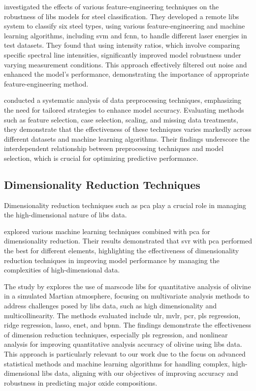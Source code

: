 \citet{jeonEffectsFeatureEngineering2024} investigated the effects of various feature-engineering techniques on the robustness of \gls{libs} models for steel classification.
They developed a remote \gls{libs} system to classify six steel types, using various feature-engineering and machine learning algorithms, including \gls{svm} and \gls{fcnn}, to handle different laser energies in test datasets.
They found that using intensity ratios, which involve comparing specific spectral line intensities, significantly improved model robustness under varying measurement conditions.
This approach effectively filtered out noise and enhanced the model's performance, demonstrating the importance of appropriate feature-engineering method.

\citet{Huang2015AnEA} conducted a systematic analysis of data preprocessing techniques, emphasizing the need for tailored strategies to enhance model accuracy.
Evaluating methods such as feature selection, case selection, scaling, and missing data treatments, they demonstrate that the effectiveness of these techniques varies markedly across different datasets and machine learning algorithms.
Their findings underscore the interdependent relationship between preprocessing techniques and model selection, which is crucial for optimizing predictive performance.

\subsection{Dimensionality Reduction Techniques}
Dimensionality reduction techniques such as \gls{pca} play a crucial role in managing the high-dimensional nature of \gls{libs} data.

\citet{rezaei_dimensionality_reduction} explored various machine learning techniques combined with \gls{pca} for dimensionality reduction. Their results demonstrated that \gls{svr} with \gls{pca} performed the best for different elements, highlighting the effectiveness of dimensionality reduction techniques in improving model performance by managing the complexities of high-dimensional data.

The study by \citet{liuComparisonQuantitativeAnalysis2022} explores the use of \gls{marscode} \gls{libs} for quantitative analysis of olivine in a simulated Martian atmosphere, focusing on multivariate analysis methods to address challenges posed by \gls{libs} data, such as high dimensionality and multicollinearity.
The methods evaluated include \gls{ulr}, \gls{mvlr}, \gls{pcr}, \gls{pls} regression, ridge regression, \gls{lasso}, \gls{enet}, and \gls{bpnn}.
The findings demonstrate the effectiveness of dimension reduction techniques, especially \gls{pls} regression, and nonlinear analysis for improving quantitative analysis accuracy of olivine using \gls{libs} data.
This approach is particularly relevant to our work due to the focus on advanced statistical methods and machine learning algorithms for handling complex, high-dimensional \gls{libs} data, aligning with our objectives of improving accuracy and robustness in predicting major oxide compositions.
